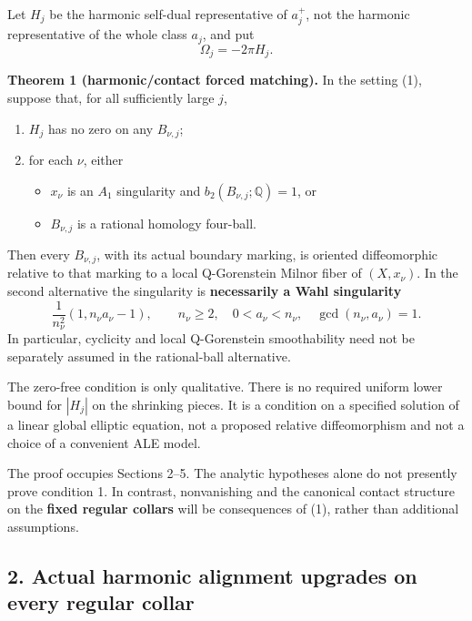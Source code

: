 \documentclass[
  11pt,
]{article}
\providecommand{\tightlist}{%
  \setlength{\itemsep}{0pt}\setlength{\parskip}{0pt}}
\begin{document}
Let \(H_j\) be the harmonic self-dual representative of \(a_j^+\), not
the harmonic representative of the whole class \(a_j\), and put \[
                         \Omega_j=-2\pi H_j.           \tag{2}
\]

\textbf{Theorem 1 (harmonic/contact forced matching).} In the setting
(1), suppose that, for all sufficiently large \(j\),

\begin{enumerate}
\def\labelenumi{\arabic{enumi}.}
\tightlist
\item
  \(H_j\) has no zero on any \(B_{\nu,j}\);
\item
  for each \(\nu\), either

  \begin{itemize}
  \tightlist
  \item
    \(x_\nu\) is an \(A_1\) singularity and
    \(b_2(B_{\nu,j};\mathbb Q)=1\), or
  \item
    \(B_{\nu,j}\) is a rational homology four-ball.
  \end{itemize}
\end{enumerate}

Then every \(B_{\nu,j}\), with its actual boundary marking, is oriented
diffeomorphic relative to that marking to a local Q-Gorenstein Milnor
fiber of \((X,x_\nu)\). In the second alternative the singularity is
\textbf{necessarily a Wahl singularity} \[
               \frac1{n_\nu^2}(1,n_\nu a_\nu-1),
 \qquad n_\nu\ge2,
 \quad 0<a_\nu<n_\nu,
 \quad \gcd(n_\nu,a_\nu)=1.                            \tag{3}
\] In particular, cyclicity and local Q-Gorenstein smoothability need
not be separately assumed in the rational-ball alternative.

The zero-free condition is only qualitative. There is no required
uniform lower bound for \(|H_j|\) on the shrinking pieces. It is a
condition on a specified solution of a linear global elliptic equation,
not a proposed relative diffeomorphism and not a choice of a convenient
ALE model.

The proof occupies Sections 2--5. The analytic hypotheses alone do not
presently prove condition 1. In contrast, nonvanishing and the canonical
contact structure on the \textbf{fixed regular collars} will be
consequences of (1), rather than additional assumptions.

\hypertarget{actual-harmonic-alignment-upgrades-on-every-regular-collar}{%
\subsection{2. Actual harmonic alignment upgrades on every regular
collar}\label{actual-harmonic-alignment-upgrades-on-every-regular-collar}}
\end{document}
